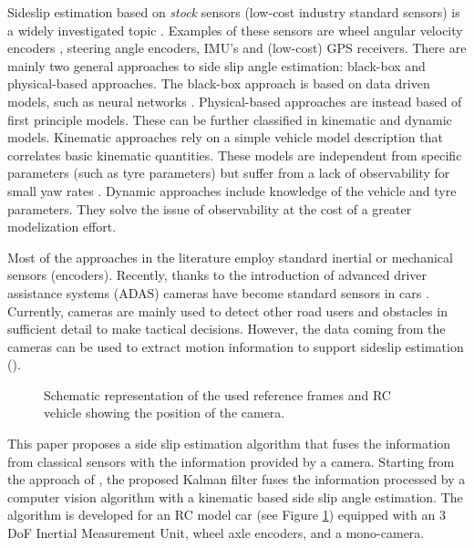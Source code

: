 \documentclass[letterpaper, 10 pt, conference]{ieeeconf}
\begin{document}
Sideslip estimation based on \emph{stock} sensors (low-cost industry standard sensors) is a widely investigated topic  \cite{hiemer2005determination,imsland2007nonlinear,baffet2009estimation,grip2009}. Examples of these sensors are wheel angular velocity encoders \cite{ito1982magnetic}, steering angle encoders, IMU's \cite{morrison1987inertial} and (low-cost) GPS receivers. There are mainly two general approaches to side slip angle estimation: black-box and physical-based approaches. The black-box approach is based on data driven models, such as neural networks \cite{sasaki2000side,milanese2007direct}. Physical-based  approaches are instead based of first principle models. These can be further classified in kinematic and dynamic models. Kinematic approaches  \cite{farrelly1996estimation} rely on a simple vehicle model description that correlates basic kinematic quantities. These models are independent from specific parameters (such as tyre parameters) but suffer from a lack of observability for small yaw rates  \cite{selmanaj2017vehicle}. Dynamic approaches include knowledge of the vehicle  and tyre parameters. They solve the issue of observability at the cost of a greater modelization effort. 
 
Most of the approaches in the literature employ standard inertial or mechanical sensors (encoders). Recently, thanks to the introduction of advanced driver assistance systems (ADAS) cameras have become standard sensors in cars \cite{ioannou2005automated,Ishida}. Currently, cameras are mainly used to detect other road users and obstacles in sufficient detail to make tactical decisions. However, the data coming from the cameras can  be used to extract motion information to support sideslip estimation (\cite{wang2014multirate,schlipsing2012roll,randeniya2010vision}). 

\begin{figure}[h]
\centering
{}
\caption{Schematic representation of the used reference frames and RC vehicle showing the position of the camera.}
\label{fig:objectives}
\end{figure}

This paper proposes a side slip estimation algorithm that fuses the information from classical sensors with the information provided by a camera.  Starting from the approach of  \cite{selmanajvehicle2016,selmanaj2017vehicle}, the proposed Kalman filter fuses the information processed by a computer vision algorithm with a kinematic based side slip angle estimation. The algorithm is developed for an RC model car  (see Figure \ref{fig:objectives}) equipped with an 3 DoF Inertial Measurement Unit, wheel axle encoders, and a mono-camera. 
\end{document}
